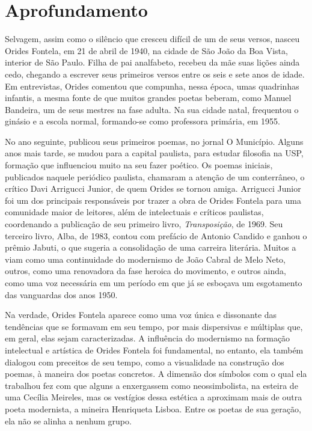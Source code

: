\documentclass[12pt]{extarticle}
\begin{document}
\section{Aprofundamento}

Selvagem, assim como o silêncio que cresceu difícil de um de seus
versos, nasceu Orides Fontela, em 21 de abril de 1940, na cidade de São
João da Boa Vista, interior de São Paulo. Filha de pai analfabeto,
recebeu da mãe suas lições ainda cedo, chegando a escrever seus
primeiros versos entre os seis e sete anos de idade. Em entrevistas,
Orides comentou que compunha, nessa época, umas quadrinhas infantis, a
mesma fonte de que muitos grandes poetas beberam, como Manuel Bandeira,
um de seus mestres na fase adulta. Na sua cidade natal, frequentou o
ginásio e a escola normal, formando-se como professora primária, em
1955.

No ano seguinte, publicou seus primeiros poemas, no jornal O Município.
Alguns anos mais tarde, se mudou para a capital paulista, para estudar
filosofia na USP, formação que influenciou muito na seu fazer poético.
Os poemas iniciais, publicados naquele periódico paulista, chamaram a
atenção de um conterrâneo, o crítico Davi Arrigucci Junior, de quem
Orides se tornou amiga. Arrigucci Junior foi um dos principais
responsáveis por trazer a obra de Orides Fontela para uma comunidade
maior de leitores, além de intelectuais e críticos paulistas,
coordenando a publicação de seu primeiro livro, \emph{Transposição}, de
1969. Seu terceiro livro, Alba, de 1983, contou com prefácio de Antonio
Candido e ganhou o prêmio Jabuti, o que sugeria a consolidação de uma
carreira literária. Muitos a viam como uma continuidade do modernismo de
João Cabral de Melo Neto, outros, como uma renovadora da fase heroica do
movimento, e outros ainda, como uma voz necessária em um período em que
já se esboçava um esgotamento das vanguardas dos anos 1950.




Na verdade, Orides Fontela aparece como uma voz única e dissonante das
tendências que se formavam em seu tempo, por mais dispersivas e
múltiplas que, em geral, elas sejam caracterizadas. A influência do
modernismo na formação intelectual e artística de Orides Fontela foi
fundamental, no entanto, ela também dialogou com preceitos de seu tempo,
como a visualidade na construção dos poemas, à maneira dos poetas
concretos. A dimensão dos símbolos com o qual ela trabalhou fez com que
alguns a enxergassem como neossimbolista, na esteira de uma Cecília
Meireles, mas os vestígios dessa estética a aproximam mais de outra
poeta modernista, a mineira Henriqueta Lisboa. Entre os poetas de sua
geração, ela não se alinha a nenhum grupo.
\end{document}
